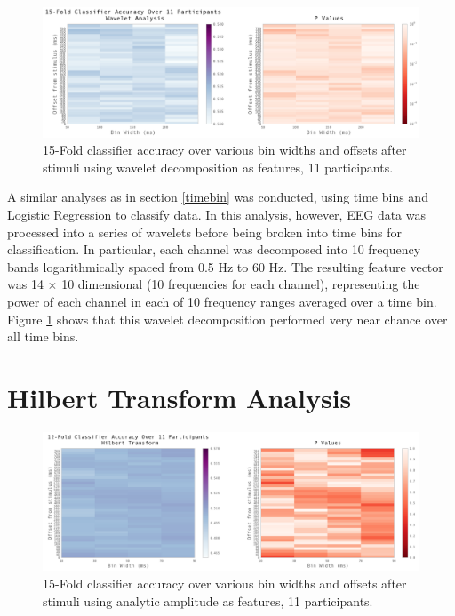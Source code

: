 \documentclass[12pt]{report}
\begin{document}
\begin{figure}[t]
\centerline{
\includegraphics[width=7in]{wavelet_gridsearch.png}
}
\caption{15-Fold classifier accuracy over various bin widths and offsets after stimuli using wavelet decomposition as features, 11 participants.\label{wavelet_gridsearch}}
\end{figure}


	A similar analyses as in section \ref{timebin} was conducted, using time bins and Logistic Regression to classify data.  In this analysis, however, EEG data was processed into a series of wavelets before being broken into time bins for classification.  In particular, each channel was decomposed into 10 frequency bands logarithmically spaced from 0.5 Hz to 60 Hz.  The resulting feature vector was 14 $\times$ 10 dimensional (10 frequencies for each channel), representing the power of each channel in each of 10 frequency ranges averaged over a time bin.  Figure \ref{wavelet_gridsearch} shows that this wavelet decomposition performed very near chance over all time bins.

\section{Hilbert Transform Analysis}  

\begin{figure}[t]
\centerline{
\includegraphics[width=7in]{hilbert_gridsearch}
}
\caption{15-Fold classifier accuracy over various bin widths and offsets after stimuli using analytic amplitude as features, 11 participants.\label{hilbert_gridsearch}}
\end{figure}
\end{document}
